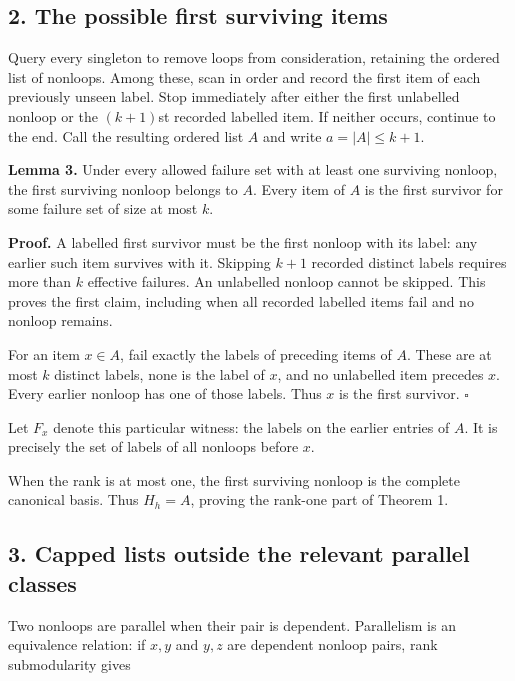 \hypertarget{af-b41875cb6e-the-possible-first-surviving-items}{%
\subsection{2. The possible first surviving items}\label{af-b41875cb6e-the-possible-first-surviving-items}}

Query every singleton to remove loops from consideration, retaining the ordered list of nonloops. Among these, scan in order and record the first item of each previously unseen label. Stop immediately after either the first unlabelled nonloop or the \((k+1)\)st recorded labelled item. If neither occurs, continue to the end. Call the resulting ordered list \(A\) and write \(a=|A|\le k+1\).

\textbf{Lemma 3.} Under every allowed failure set with at least one surviving nonloop, the first surviving nonloop belongs to \(A\). Every item of \(A\) is the first survivor for some failure set of size at most \(k\).

\textbf{Proof.} A labelled first survivor must be the first nonloop with its label: any earlier such item survives with it. Skipping \(k+1\) recorded distinct labels requires more than \(k\) effective failures. An unlabelled nonloop cannot be skipped. This proves the first claim, including when all recorded labelled items fail and no nonloop remains.

For an item \(x\in A\), fail exactly the labels of preceding items of \(A\). These are at most \(k\) distinct labels, none is the label of \(x\), and no unlabelled item precedes \(x\). Every earlier nonloop has one of those labels. Thus \(x\) is the first survivor. \(\square\)

Let \(F_x\) denote this particular witness: the labels on the earlier entries of \(A\). It is precisely the set of labels of all nonloops before \(x\).

When the rank is at most one, the first surviving nonloop is the complete canonical basis. Thus \(H_h=A\), proving the rank-one part of Theorem 1.

\hypertarget{af-b41875cb6e-capped-lists-outside-the-relevant-parallel-classes}{%
\subsection{3. Capped lists outside the relevant parallel classes}\label{af-b41875cb6e-capped-lists-outside-the-relevant-parallel-classes}}

Two nonloops are parallel when their pair is dependent. Parallelism is an equivalence relation: if \(x,y\) and \(y,z\) are dependent nonloop pairs, rank submodularity gives

